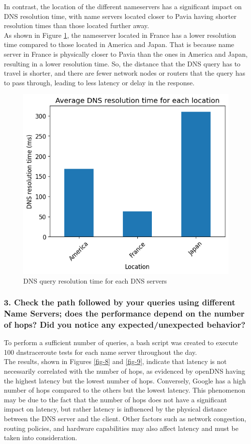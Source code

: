 \documentclass[eng]{class}
\begin{document}
In contrast, the location of the different nameservers has a significant impact on DNS resolution time,
with name servers located closer to Pavia having shorter resolution times than those located further away.\\
As shown in Figure \ref{fig-7}, the nameserver located in France has a lower resolution time compared to those located in America and Japan.
That is because name server in France is physically closer to Pavia than the ones in America and Japan, resulting in a lower resolution time.
So, the distance that the DNS query has to travel is shorter, and there are fewer network nodes or routers that the query has to pass through, leading to less latency or delay in the response.
\begin{figure}[H]
  \centering
  \includegraphics[width=.7\columnwidth]{images/avgLat2.2.loc.png}
  \caption{DNS query resolution time for each DNS servers}
  \label{fig-7}
\end{figure}
\subsubsection*{3. Check the path followed by your queries using different Name Servers; does the
  performance depend on the number of hops? Did you notice any
  expected/unexpected behavior?}

To perform a sufficient number of queries, a bash script was created to execute 100 dnstraceroute tests for each name server throughout the day.\\
The results, shown in Figures \ref{fig-8} and \ref{fig-9}, indicate that latency is not necessarily correlated with the number of hops,
as evidenced by openDNS having the highest latency but the lowest number of hops.
Conversely, Google has a high number of hops compared to the others but the lowest latency.
This phenomenon may be due to the fact that the number of hops does not have a significant impact on latency,
but rather latency is influenced by the physical distance between the DNS server and the client.
Other factors such as network congestion, routing policies, and hardware capabilities may also affect latency and must be taken into consideration.
\end{document}
